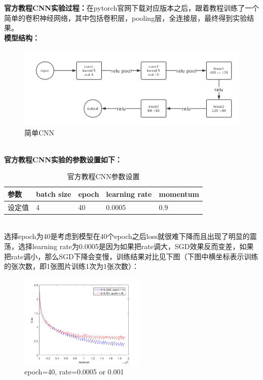 \documentclass[a4paper,UTF8]{article}
\numberwithin{equation}{section}
\begin{document}
\begin{enumerate}
\textbf{官方教程CNN实验过程：}在pytorch官网下载对应版本之后，跟着教程训练了一个简单的卷积神经网络，其中包括卷积层，pooling层，全连接层，最终得到实验结果。\\
\textbf{模型结构：}
\begin{figure}[!h]
	\centering   
	\includegraphics[scale=0.5]{ng1.png}  
	\caption{简单CNN} 
	\label{ng1}
\end{figure}\\
\textbf{官方教程CNN实验的参数设置如下：}
\begin{table}[h]
	\centering
	\caption{官方教程CNN参数设置}
	\label{cn1}
	\begin{tabular}{|l|l|l|l|l|}
		\hline
		参数	& batch size & epoch & learning rate & momentum \\ \hline
		设定值	& 4 & 40 & 0.0005 & 0.9 \\ \hline
	\end{tabular}
\end{table}\\
选择epoch为40是考虑到模型在40个epoch之后loss就很难下降而且出现了明显的震荡，选择learning rate为0.0005是因为如果把rate调大，SGD效果反而变差，如果把rate调小，那么SGD下降会变慢，训练结果对比见下图（下图中横坐标表示训练的张次数，即1张图片训练1次为1张次数）：
\begin{figure}[htbp]
	\centering
	\begin{minipage}[t]{0.48\textwidth}
		\centering
		\includegraphics[width=6cm]{net-0005-001-40.png}
		\caption{epoch=40, rate=0.0005 or 0.001}
	\end{minipage}
	\begin{minipage}[t]{0.48\textwidth}

\end{minipage}
\end{figure}
\end{enumerate}
\end{document}
